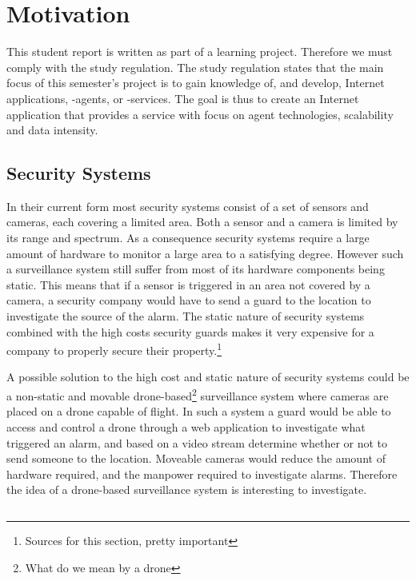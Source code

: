\section{Motivation}
This student report is written as part of a learning project. Therefore we must comply with the study regulation.
The study regulation states that the main focus of this semester's project is to gain knowledge of, and develop, Internet applications, -agents, or -services.
The goal is thus to create an Internet application that provides a service with focus on agent technologies, scalability and data intensity.

\subsection{Security Systems}
In their current form most security systems consist of a set of sensors and cameras, each covering a limited area.
Both a sensor and a camera is limited by its range and spectrum.
As a consequence security systems require a large amount of hardware to monitor a large area to a satisfying degree.
However such a surveillance system still suffer from most of its hardware components being static.
This means that if a sensor is triggered in an area not covered by a camera, a security company would have to send a guard to the location to investigate the source of the alarm.
The static nature of security systems combined with the high costs security guards makes it very expensive for a company to properly secure their property.\footnote{Sources for this section, pretty important}

A possible solution to the high cost and static nature of security systems could be a non-static and movable drone-based\footnote{What do we mean by a drone} surveillance system where cameras are placed on a drone capable of flight.
In such a system a guard would be able to access and control a drone through a web application to investigate what triggered an alarm, and based on a video stream determine whether or not to send someone to the location.
Moveable cameras would reduce the amount of hardware required, and the manpower required to investigate alarms.
Therefore the idea of a drone-based surveillance system is interesting to investigate.

\subsection{}




